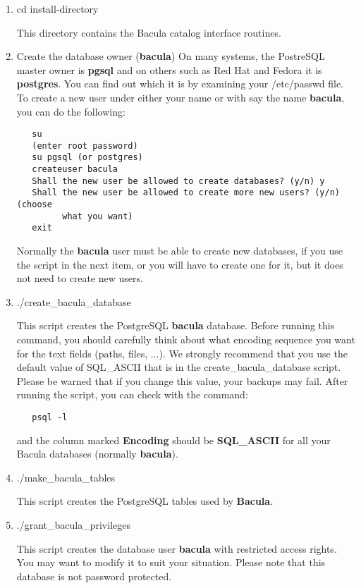 \begin{enumerate}
\item cd \lt{}install-directory\gt{}

   This directory contains the Bacula catalog interface routines.  

\item Create the database owner ({\bf bacula})
   On many systems, the PostreSQL master 
   owner is {\bf pgsql} and on others such as Red Hat and Fedora it is {\bf
   postgres}.  You can find out which it is by examining your /etc/passwd
   file.  To create a new user under either your name or with say the name
   {\bf bacula}, you can do the following:

\begin{verbatim}
   su
   (enter root password)
   su pgsql (or postgres)
   createuser bacula
   Shall the new user be allowed to create databases? (y/n) y
   Shall the new user be allowed to create more new users? (y/n) (choose
         what you want)
   exit
\end{verbatim}
   Normally the {\bf bacula} user must be able to create new databases,
   if you use the script in the next item, 
   or you will have to create one for it, but it does not need to 
   create new users.

\item ./create\_bacula\_database

   This script creates the PostgreSQL {\bf bacula} database.  
   Before running this command, you should carefully think about
   what encoding sequence you want for the text fields (paths, files, ...).
   We strongly recommend that you use the default value of SQL\_ASCII
   that is in the create\_bacula\_database script.  Please be warned
   that if you change this value, your backups may fail.  After running
   the script, you can check with the command:

\begin{verbatim}
   psql -l
\end{verbatim}

   and the column marked {\bf Encoding} should be {\bf SQL\_ASCII} for
   all your Bacula databases (normally {\bf bacula}).

\item ./make\_bacula\_tables

   This script creates the PostgreSQL tables used by {\bf Bacula}.  
\item ./grant\_bacula\_privileges

   This script creates the database user {\bf bacula}  with restricted access
rights. You may  want to modify it to suit your situation. Please note that 
this database is not password protected.  

\end{enumerate}

